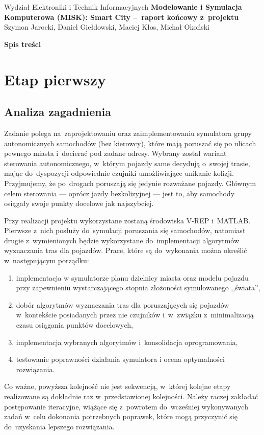 \documentclass[11pt, a4paper, twoside]{report}
\makeatletter
\newcommand*{\toccontents}{\@starttoc{toc}}
\makeatother
\begin{document}
	\begin{center} 
		{\Large Wydział Elektroniki i Technik Informacyjnych}
		\vskip0.2cm
		{\LARGE \textbf{Modelowanie i Symulacja Komputerowa (MISK): Smart City --~raport końcowy z~projektu   } } 
		\vskip0.3cm
		{\Large Szymon Jarocki, Daniel Giełdowski, Maciej Kłos, Michał Okoński}
		\vskip3.0cm
	\end{center}	
	\begin{flushleft}
		{\LARGE \textbf{Spis treści} } 
	\end{flushleft}
	
	\toccontents
	

\chapter{Etap pierwszy}	
\section{Analiza zagadnienia}
\label{sec:analiza}
Zadanie polega na~zaprojektowaniu oraz zaimplementowaniu symulatora grupy autonomicznych samochodów (bez kierowcy), które mają poruszać się po ulicach pewnego miasta i~docierać pod zadane adresy. Wybrany został wariant sterowania autonomicznego, w~którym pojazdy same decydują o~swojej trasie, mając do~dyspozycji odpowiednie czujniki umożliwiające unikanie kolizji. Przyjmujemy, że po~drogach poruszają się jedynie rozważane pojazdy. Głównym celem sterowania --- oprócz jazdy bezkolizyjnej --- jest to, aby samochody osiągały swoje punkty docelowe jak najszybciej.

Przy realizacji projektu wykorzystane zostaną środowiska V-REP i~MATLAB. Pierwsze z~nich posłuży do~symulacji poruszania się samochodów, natomiast drugie z~wymienionych będzie wykorzystane do~implementacji algorytmów wyznaczania tras dla pojazdów. Prace, które są do~wykonania można określić w~następującym porządku:
\begin{enumerate}[1)]
	\item implementacja w symulatorze planu dzielnicy miasta oraz modelu pojazdu przy zapewnieniu wystarczającego stopnia złożoności symulowanego ,,świata'',
	\item dobór algorytmów wyznaczania tras dla poruszających się pojazdów w~kontekście posiadanych przez nie czujników i~w~związku z~minimalizacją czasu osiągania punktów docelowych,
	\item implementacja wybranych algorytmów i~konsolidacja oprogramowania,
	\item testowanie poprawności działania symulatora i ocena optymalności rozwiązania.
\end{enumerate}
Co ważne, powyższa kolejność nie jest sekwencją, w~której kolejne etapy realizowane są dokładnie raz w~przedstawionej kolejności. Należy raczej zakładać postępowanie iteracyjne, wiążące się z~powrotem do~wcześniej wykonywanych zadań w~celu dokonania potrzebnych poprawek, które mogą przyczynić się do~uzyskania lepszego rozwiązania.
\end{document}

